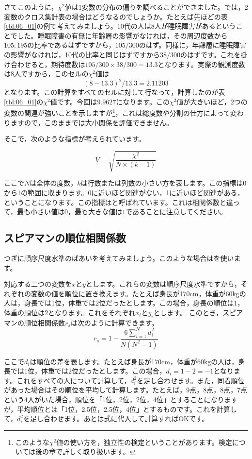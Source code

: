 \documentclass{ltjsbook}
\begin{document}
さてこのように，$\chi^2$値は1変数の分布の偏りを調べることができました。では，2変数のクロス集計表の場合はどうなるのでしょうか。たとえば先ほどの表\ref{tbl:06_01}の例で考えてみましょう。10代の人は8人が睡眠障害があるということでした。睡眠障害の有無に年齢層の影響がなければ，その周辺度数から$105:195$の比率であるはずですから，$105/300$のはず。同様に，年齢層に睡眠障害の影響がなければ，10代の比率と同じはずですから$38/300$のはずです。これを掛け合わせると，期待度数は$105/300 \times 38/300 = 13.3$となります。実際の観測度数は8人ですから，このセルの$\chi^2$値は
\[ (8 - 13.3)^2 / 13.3 = 2.11203 \]
となります。この計算をすべてのセルに対して行なって，計算したのが表\ref{tbl:06_01}の$\chi^2$値です。今回は$9.9627$になります。この$\chi^2$値が大きいほど，2つの変数の関連が強いことを示しますが\footnote{このような$\chi^2$値の使い方を，独立性の検定ということがあります。検定については後の章で詳しく取り扱います。}，これは総度数や分割の仕方によって変わりますので，このままでは大小関係を評価できません。

そこで，次のような指標が考えられています。

\[ V = \sqrt{\frac{\chi^2}{N \times (k - 1)}} \]

ここで$N$は全体の度数，$k$は行数または列数の小さい方を表します。この指標は0から1の範囲に収まります。0に近いほど関連がない，1に近いほど関連がある，ということになります。この指標はと呼ばれています。これは相関係数と違って，最も小さい値は$0$，最も大きな値は$1$であることに注意してください。

\subsection{スピアマンの順位相関係数}
つぎに順序尺度水準のばあいを考えてみましょう。このような場合はを使います。

対応する二つの変数を$x$と$y$とします。これらの変数は順序尺度水準ですから，それぞれの変数の値を順位に置き換えます。たとえば身長が170cm，体重が60kgの人は，身長では1位，体重では2位だったとします。この場合，身長の順位は1，体重の順位は2となります。これをそれぞれ$x_i$と$y_i$とします。
このとき，スピアマンの順位相関係数$r_s$は次のように計算できます。
\[
    r_s = 1 - \frac{6\sum_{i=1}^N d_i^2}{N(N^2 - 1)}
\]

ここで$d_i$は順位の差を表します。たとえば身長が170cm，体重が60kgの人は，身長では1位，体重では2位だったとします。この場合，$d_i = 1 - 2 = -1$となります。これをすべての人について計算して，$d_i^2$を足し合わせます。また，同着順位があった場合はその順位を平均して計算します。たとえば，9点，8点，8点，7点という4人がいた場合，順位を「1位，2位，2位，4位」とすることになりますが，平均順位とは「1位，2.5位，2.5位，4位」とするものです。これを計算して，$d_i^2$を足し合わせます。あとは式に代入して計算すればOKです。
\end{document}
